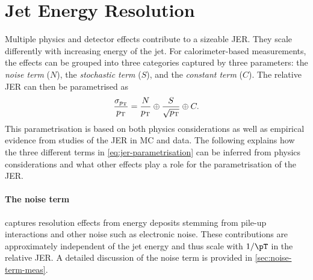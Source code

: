 \section{Jet Energy Resolution}
\label{sec:jer}
Multiple physics and detector effects contribute to a sizeable JER. They scale differently with increasing energy of the jet. For calorimeter-based measurements, the effects can be grouped into three categories captured by three parameters: the \emph{noise term} ($N$), the \emph{stochastic term} ($S$), and the \emph{constant term} ($C$).
The relative JER can then be parametrised as
\begin{equation}
    \label{eq:jer-parametrisation}
    \frac{\sigma_{p_{\rm T}}}{p_{\rm T}} = \frac{N}{p_{\rm T}} \oplus \frac{S}{\sqrt{p_{\rm T}}} \oplus C.
\end{equation}
This parametrisation is based on both physics considerations as well as empirical evidence from studies of the JER in MC and data. 
The following explains how the three different terms in \cref{eq:jer-parametrisation} can be inferred from physics considerations and what other effects play a role for the parametrisation of the JER.

\paragraph{The noise term} captures resolution effects from energy deposits stemming from pile-up interactions and other noise such as electronic noise. 
These contributions are approximately independent of the jet energy and thus scale with $1 / \pT$ in the relative JER. A detailed discussion of the noise term is provided in \cref{sec:noise-term-meas}.

